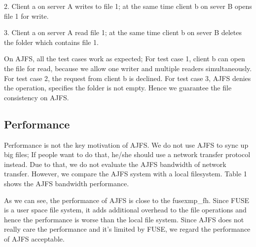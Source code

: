 2. Client a on server A writes to file 1; at the same time client b on sever B opens file 1 for write.

3. Client a on server A read file 1; at the same time client b on sever B deletes the folder which contains file 1.

On AJFS, all the test cases work as expected; For test case 1, client b can open the file for read, because we allow one writer and multiple readers simultaneously. For test case 2, the request from client b is declined. For test case 3, AJFS denies the operation, specifies the folder is not empty. Hence we guarantee the file consistency on AJFS.

\subsection{Performance}

Performance is not the key motivation of AJFS. We do not use AJFS to sync up big files; If people want to do that, he/she should use a network transfer protocol instead. Due to that, we do not evaluate the AJFS bandwidth of network transfer.
However, we compare the AJFS system with a local filesystem. Table 1 shows the AJFS bandwidth performance. 

As we can see, the performance of AJFS is close to the fusexmp\_fh. Since FUSE is a user space file system, it adds additional overhead to the file operations and hence the performance is worse than the local file system. Since AJFS does not really care the performance and it's limited by FUSE, we regard the performance of AJFS acceptable. 
